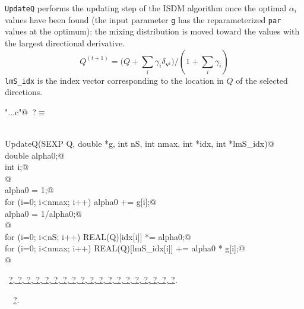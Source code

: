 \documentclass[reqno]{amsart}
\renewcommand{\NWtarget}[2]{\hypertarget{#1}{#2}}
\renewcommand{\NWlink}[2]{\hyperlink{#1}{#2}}
\newcommand{\bv}{\mathbf{v}}
\providecommand{\tsum}{\textstyle\sum}
\begin{document}
\texttt{UpdateQ} performs the updating step of the ISDM algorithm once the optimal
$\alpha_i$ values have been found (the input parameter \texttt{g} has the reparameterized 
\texttt{par} values at the optimum): the mixing
distribution is moved toward the values with the largest directional derivative.
\begin{equation}
Q^{(t+1)} =  \big(Q + \tsum_i\gamma_i\delta_{\bv^i}\big)/(1+\tsum_i\gamma_i)
\end{equation}
\texttt{lmS\_idx} is the index vector corresponding to the location in $Q$ of the 
selected directions.

\begin{flushleft} \small
\begin{minipage}{\linewidth}\label{scrap30}\raggedright\small
\NWtarget{nuweb?}{} \verb@"..\src\ReprodCalcs.c"@\nobreak\ {\footnotesize {?}}$\equiv$
\vspace{-1ex}
\begin{list}{}{} \item
\mbox{}\verb@@\\
\mbox{}\verb@void UpdateQ(SEXP Q, double *g, int nS, int nmax, int *idx, int *lmS_idx){@\\
\mbox{}\verb@   double alpha0;@\\
\mbox{}\verb@   int i;@\\
\mbox{}\verb@   @\\
\mbox{}\verb@   alpha0 = 1;@\\
\mbox{}\verb@   for (i=0; i<nmax; i++) alpha0 += g[i];@\\
\mbox{}\verb@   alpha0 = 1/alpha0;@\\
\mbox{}\verb@   @\\
\mbox{}\verb@   for (i=0; i<nS; i++) REAL(Q)[idx[i]] *= alpha0;@\\
\mbox{}\verb@   for (i=0; i<nmax; i++) REAL(Q)[lmS_idx[i]] += alpha0 * g[i];@\\
\mbox{}\verb@}@\\
\mbox{}\verb@@{\NWsep}
\end{list}
\vspace{-1.5ex}
\footnotesize
\begin{list}{}{\setlength{\itemsep}{-\parsep}\setlength{\itemindent}{-\leftmargin}}
\item \NWtxtFileDefBy\ \NWlink{nuweb?}{?}\NWlink{nuweb?}{, ?}\NWlink{nuweb?}{, ?}\NWlink{nuweb?}{, ?}\NWlink{nuweb?}{, ?}\NWlink{nuweb?}{, ?}\NWlink{nuweb?}{, ?}\NWlink{nuweb?}{, ?}\NWlink{nuweb?}{, ?}\NWlink{nuweb?}{, ?}\NWlink{nuweb?}{, ?}\NWlink{nuweb?}{, ?}\NWlink{nuweb?}{, ?}\NWlink{nuweb?}{, ?}\NWlink{nuweb?}{, ?}\NWlink{nuweb?}{, ?}\NWlink{nuweb?}{, ?}\NWlink{nuweb?}{, ?}\NWlink{nuweb?}{, ?}.
\item \NWtxtIdentsDefed\nobreak\  \verb@UpdateQ@\nobreak\ \NWlink{nuweb?}{?}.
\item{}
\end{list}
\end{minipage}\vspace{4ex}
\end{flushleft}
\end{document}
